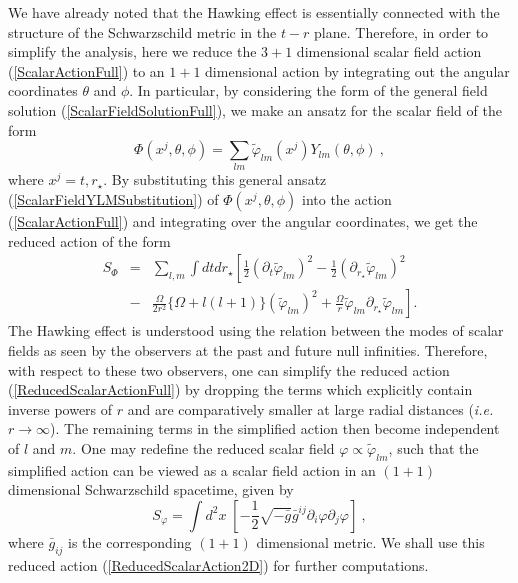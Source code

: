 \documentclass[aps,12pt,showpacs]{revtex4-2}
\def\rstar{r_{\star}}
\begin{document}
We have already noted that the Hawking effect is essentially connected with 
the structure of the Schwarzschild metric in the $t-r$ plane. Therefore, in 
order to  simplify the analysis, here we reduce the $3+1$ dimensional scalar 
field action (\ref{ScalarActionFull}) to an $1+1$ dimensional action by 
integrating out the angular coordinates $\theta$ and $\phi$. In particular, 
by considering the form of the general field solution 
(\ref{ScalarFieldSolutionFull}), we make an ansatz for the scalar field of the 
form
%
\begin{equation}\label{ScalarFieldYLMSubstitution}
\Phi(x^j,\theta,\phi) = \sum_{lm}  \tilde{\varphi}_{lm}(x^j) 
Y_{lm}(\theta,\phi) ~,
\end{equation}
%
where $x^j = t,\rstar$. By substituting this general ansatz 
(\ref{ScalarFieldYLMSubstitution})  of $\Phi(x^j,\theta,\phi)$ into the action 
(\ref{ScalarActionFull}) and integrating over the angular coordinates, we get 
the reduced action of the form
%
\begin{eqnarray}
S_{\Phi} &=& \sum_{l,m} \int dt d\rstar \left[ 
\frac{1}{2}(\partial_{t}\tilde{\varphi}_{lm})^{2}-\frac{1}{2}(\partial_{\rstar}
\tilde{\varphi}_{lm})^{2} \right. \nonumber\\
      &-& \left. \frac{\Omega}{2r^{2}}  \{\Omega+l(l+1)\} 
(\tilde{\varphi}_{lm})^{2} +\frac{\Omega}{r}
\tilde{\varphi}_{lm} \partial_{\rstar} \tilde{\varphi}_{lm}  \right].
\label{ReducedScalarActionFull}
\end{eqnarray}
%
The Hawking effect is understood using the relation between the modes of scalar 
fields as seen by the observers at the past and future null infinities. 
Therefore, with respect to these two observers, one can simplify the reduced 
action (\ref{ReducedScalarActionFull}) by dropping the terms which explicitly 
contain inverse powers of $r$ and are comparatively smaller at large radial 
distances (\emph{i.e.} $r\to\infty$). The remaining terms in the simplified 
action then become independent of $l$ and $m$. One may redefine the reduced 
scalar field $\varphi \propto \tilde{\varphi}_{lm}$, such that the simplified 
action can be viewed as a scalar field action in an $(1+1)$ dimensional 
Schwarzschild spacetime, given by
%
\begin{equation}\label{ReducedScalarAction2D}
S_{\varphi} = \int d^{2}x\;\left[ -\frac{1}{2} \sqrt{-\bar{g}} \bar{g}^{ij} 
\partial_{i}\varphi \partial_{j} \varphi \right] ~,
\end{equation}
%
where $\bar{g}_{ij}$ is the corresponding $(1+1)$ dimensional metric. We shall 
use this reduced action (\ref{ReducedScalarAction2D}) for further computations.
\end{document}
